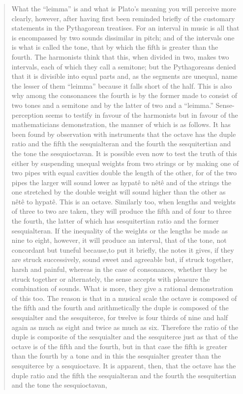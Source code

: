 \documentclass{article}
\theoremstyle{definition}
\begin{document}
\begin{quote}
What the ``leimma'' is and what is Plato's meaning you will perceive more clearly, however, after having first been reminded briefly of the customary statements in the Pythagorean treatises. For an interval in music is all that is encompassed by two sounds dissimilar in pitch; and of the intervals one is what is called the tone, that by which the fifth is greater than
 the fourth. The harmonists think that this, when divided in two, makes two intervals, each of which they call a semitone; but the Pythagoreans denied that it is divisible into equal
 parts and, as the segments are unequal, name the lesser of them ``leimma'' because it falls short of the half. This is also why among the consonances the fourth is by the former 
 made to consist of two tones and a semitone and by the latter of two and a ``leimma.'' Sense-perception seems to testify in favour of the harmonists but in favour of the
 mathematicians demonstration, the manner of which is
 as follows. It has been found by observation with instruments that the octave has the duple ratio and the fifth the sesquialteran and the fourth the sesquitertian and the tone
 the sesquioctavan. It is possible even now to test the truth of this either by suspending unequal weights from two strings or by making one of two pipes with equal cavities double
 the length of the other, for of the two pipes the larger will sound lower as hypat\^e to n\^et\^e and of the strings the one stretched by the double weight will 
 sound higher than the other as n\^et\^e to hypat\^e. This is an octave. Similarly too, when lengths and weights of three to two are taken, they will produce the fifth and of four to three
 the fourth, the latter of which has sesquitertian ratio and the former sesquialteran. If the inequality of the weights or the
 lengths be made as nine to eight, however, it will produce an interval, that of the tone, not concordant but tuneful because,to put it briefly, the notes it gives, if they are struck 
 successively, sound sweet and agreeable but, if struck together, harsh and painful, whereas in the case of consonances, whether they be struck together or alternately, the sense
  accepts with pleasure the combination of sounds. What is more, they give a rational demonstration of this too. The reason is that in a musical scale the octave is composed of the 
  fifth and the fourth and arithmetically the duple is composed of the sesquialter and the sesquiterce, for twelve is four thirds of nine and half again as much as eight and twice as
   much as six. Therefore the ratio of the duple is composite of the sesquialter and the sesquiterce just as that of the octave is of the fifth and the fourth, but in that case the fifth is 
   greater than the fourth by a tone and in this the sesquialter greater than the sesquiterce by a sesquioctave. It is apparent, then, that the octave
has the duple ratio and the fifth the sesquialteran and the fourth the sesquitertian and the tone the sesquioctavan,
\end{quote}
\end{document}
